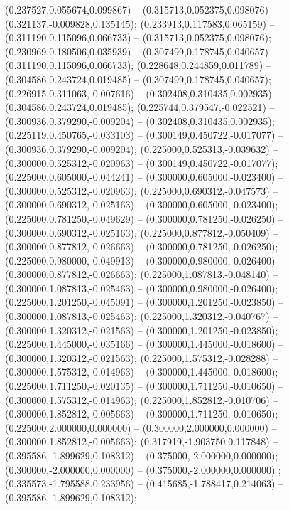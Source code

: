  (0.237527,0.055674,0.099867) -- (0.315713,0.052375,0.098076) -- (0.321137,-0.009828,0.135145);
 (0.233913,0.117583,0.065159) -- (0.311190,0.115096,0.066733) -- (0.315713,0.052375,0.098076);
 (0.230969,0.180506,0.035939) -- (0.307499,0.178745,0.040657) -- (0.311190,0.115096,0.066733);
 (0.228648,0.244859,0.011789) -- (0.304586,0.243724,0.019485) -- (0.307499,0.178745,0.040657);
 (0.226915,0.311063,-0.007616) -- (0.302408,0.310435,0.002935) -- (0.304586,0.243724,0.019485);
 (0.225744,0.379547,-0.022521) -- (0.300936,0.379290,-0.009204) -- (0.302408,0.310435,0.002935);
 (0.225119,0.450765,-0.033103) -- (0.300149,0.450722,-0.017077) -- (0.300936,0.379290,-0.009204);
 (0.225000,0.525313,-0.039632) -- (0.300000,0.525312,-0.020963) -- (0.300149,0.450722,-0.017077);
 (0.225000,0.605000,-0.044241) -- (0.300000,0.605000,-0.023400) -- (0.300000,0.525312,-0.020963);
 (0.225000,0.690312,-0.047573) -- (0.300000,0.690312,-0.025163) -- (0.300000,0.605000,-0.023400);
 (0.225000,0.781250,-0.049629) -- (0.300000,0.781250,-0.026250) -- (0.300000,0.690312,-0.025163);
 (0.225000,0.877812,-0.050409) -- (0.300000,0.877812,-0.026663) -- (0.300000,0.781250,-0.026250);
 (0.225000,0.980000,-0.049913) -- (0.300000,0.980000,-0.026400) -- (0.300000,0.877812,-0.026663);
 (0.225000,1.087813,-0.048140) -- (0.300000,1.087813,-0.025463) -- (0.300000,0.980000,-0.026400);
 (0.225000,1.201250,-0.045091) -- (0.300000,1.201250,-0.023850) -- (0.300000,1.087813,-0.025463);
 (0.225000,1.320312,-0.040767) -- (0.300000,1.320312,-0.021563) -- (0.300000,1.201250,-0.023850);
 (0.225000,1.445000,-0.035166) -- (0.300000,1.445000,-0.018600) -- (0.300000,1.320312,-0.021563);
 (0.225000,1.575312,-0.028288) -- (0.300000,1.575312,-0.014963) -- (0.300000,1.445000,-0.018600);
 (0.225000,1.711250,-0.020135) -- (0.300000,1.711250,-0.010650) -- (0.300000,1.575312,-0.014963);
 (0.225000,1.852812,-0.010706) -- (0.300000,1.852812,-0.005663) -- (0.300000,1.711250,-0.010650);
 (0.225000,2.000000,0.000000) -- (0.300000,2.000000,0.000000) -- (0.300000,1.852812,-0.005663);
 (0.317919,-1.903750,0.117848) -- (0.395586,-1.899629,0.108312) -- (0.375000,-2.000000,0.000000);
 (0.300000,-2.000000,0.000000) -- (0.375000,-2.000000,0.000000) ;
 (0.335573,-1.795588,0.233956) -- (0.415685,-1.788417,0.214063) -- (0.395586,-1.899629,0.108312);
